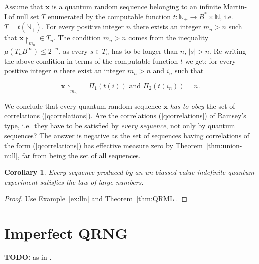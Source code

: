\documentclass[%
 preprint,
 showpacs,
 showkeys,
 preprintnumbers,
  amsmath,amssymb,
  aps,
 pra,
  longbibliography,
  floatfix,
 ]{revtex4-1}
\theoremstyle{plain}
\newtheorem{corollary}[theorem]{Corollary}
\newcommand{\rest}[2]{#1\!\!\restriction_{#2}}
\newcommand{\N}{\mathbb{N}}%
\newcommand{\B}{B^*}%
\newcommand{\BI}{B^\infty}%
\newcommand{\x}{\mathbf{x}}
\newcommand{\ar}{\rightarrow}
\begin{document}
  Assume that $\x$ is a quantum random sequence belonging to an infinite Martin-L\"of null set $T$ enumerated by the computable function $t: \N_{+} \ar \B \times \N$, i.e.\ $T= t(\N_{+})$. For every positive integer $n$ there exists an integer $m_{n}>n$ such that $\rest{\x}{m_{n}}\in T_{n}$.
The condition $m_{n}>n$ comes from the inequality $ \mu (T_{n}\BI) \le 2^{-n}$, as every
$s\in T_{n}$ has to be longer than $n$, $|s|>n$. Re-writing the above condition in terms of the computable function $t$ we get: for every positive integer $n$ there exist an integer $m_{n}>n$ and $i_{n}$ such that

\begin{equation}
\label{qcorrelations}
\rest{\x}{m_{n}}= \Pi_{1}(t(i)) \text{ and }  \Pi_{2}(t(i_{n}))=n.
\end{equation}

We conclude that every quantum random sequence $\x$  {\em has to obey} the set of correlations (\ref{qcorrelations}). Are  the correlations  (\ref{qcorrelations})
  of Ramsey's type, i.e.\ they have to be satisfied by {\em every sequence}, not only by quantum sequences? The answer is negative as the set of sequences having correlations of the form (\ref{qcorrelations}) has effective measure zero by Theorem~\ref{thm:union-null}, far from being the set of all sequences.

 \medskip


\begin{corollary}Every sequence produced by an un-biassed  value indefinite quantum experiment  satisfies the law of large numbers.
\end{corollary}
\begin{proof}Use Example~\ref{ex:lln} and Theorem~\ref{thm:QRML}.
\end{proof}


\section{Imperfect QRNG}
{\bf TODO:}   as in \cite{ACCS}.
\end{document}
